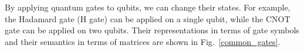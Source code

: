 \documentclass[runningheads]{llncs}
\begin{document}
By applying quantum gates to qubits, we can change their states.
For example, the Hadamard gate (H gate) can be applied on a single qubit, while the CNOT gate can be applied on two qubits. Their representations in terms of  gate symbols and their semantics in terms of matrices are shown in Fig.~\ref{common_gates}. 
{
\begin{figure}[t]
	 \begin{center}
\end{center}
\end{figure}}
\end{document}

